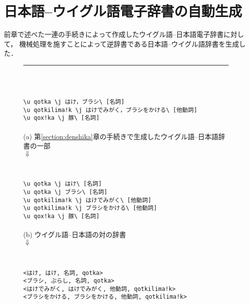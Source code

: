 \section{日本語--ウイグル語電子辞書の自動生成}\label{section:jidoseisei}
前章で述べた一連の手続きによって作成したウイグル語--日本語電子辞書に対して，
機械処理を施すことによって逆辞書である日本語--ウイグル語辞書を生成した． 
{\begin{figure}[p]
\begin{center}
\rule{0.9\textwidth}{0.2mm} \\ 
\mbox{} \\
\begin{minipage}{0.9\textwidth}
\small
 \verb+\u qotka \j はけ，ブラシ\ [名詞]+\\
 \verb+\u qotkilima!k \j はけでみがく，ブラシをかける\ [他動詞]+\\
 \verb+\u qox!ka \j 豚\ [名詞]+ \\ \\
\hspace*{2cm}(a) 第\ref{section:denshika}章の手続きで生成したウイグル語--日本語辞書の一部 \\
\hspace*{4cm}$\Downarrow$ \\
\end{minipage} \\
\begin{minipage}{0.9\textwidth}
\small
 \verb+\u qotka \j はけ\ [名詞]+\\
 \verb+\u qotka \j ブラシ\ [名詞]+\\
 \verb+\u qotkilima!k \j はけでみがく\ [他動詞]+\\
 \verb+\u qotkilima!k \j ブラシをかける\ [他動詞]+\\
 \verb+\u qox!ka \j 豚\ [名詞]+ \\ \\
\hspace*{2cm}(b) ウイグル語--日本語の対の辞書 \\
\hspace*{4cm}$\Downarrow$\\
\end{minipage} \\
\begin{minipage}{0.9\textwidth}
 \verb+<はけ, はけ, 名詞, qotka>+\\
 \verb+<ブラシ, ぶらし, 名詞, qotka>+\\
 \verb+<はけでみがく, はけでみがく, 他動詞, qotkilima!k>+\\
 \verb+<ブラシをかける, ブラシをかける, 他動詞, qotkilima!k>+\\

\end{minipage}
\end{center}
\end{figure}}
